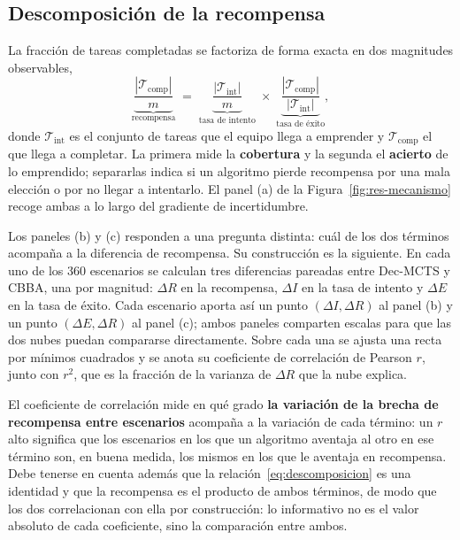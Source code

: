 \subsection{Descomposición de la recompensa} \label{subsec:exp-mecanismo}

La fracción de tareas completadas se factoriza de forma exacta en dos magnitudes observables,
\begin{equation} \label{eq:descomposicion}
    \underbrace{\frac{|\mathcal{T}_{\mathrm{comp}}|}{m}}_{\text{recompensa}}
    \;=\;
    \underbrace{\frac{|\mathcal{T}_{\mathrm{int}}|}{m}}_{\text{tasa de intento}}
    \;\times\;
    \underbrace{\frac{|\mathcal{T}_{\mathrm{comp}}|}{|\mathcal{T}_{\mathrm{int}}|}}_{\text{tasa de éxito}},
\end{equation}
donde $\mathcal{T}_{\mathrm{int}}$ es el conjunto de tareas que el equipo llega a emprender y $\mathcal{T}_{\mathrm{comp}}$ el que llega a completar. La primera mide la \textbf{cobertura} y la segunda el \textbf{acierto} de lo emprendido; separarlas indica si un algoritmo pierde recompensa por una mala elección o por no llegar a intentarlo. El panel (a) de la Figura~\ref{fig:res-mecanismo} recoge ambas a lo largo del gradiente de incertidumbre.

Los paneles (b) y (c) responden a una pregunta distinta: cuál de los dos términos acompaña a la diferencia de recompensa. Su construcción es la siguiente. En cada uno de los $360$ escenarios se calculan tres diferencias pareadas entre Dec-MCTS y CBBA, una por magnitud: $\Delta R$ en la recompensa, $\Delta I$ en la tasa de intento y $\Delta E$ en la tasa de éxito. Cada escenario aporta así un punto $(\Delta I, \Delta R)$ al panel (b) y un punto $(\Delta E, \Delta R)$ al panel (c); ambos paneles comparten escalas para que las dos nubes puedan compararse directamente. Sobre cada una se ajusta una recta por mínimos cuadrados y se anota su coeficiente de correlación de Pearson $r$, junto con $r^2$, que es la fracción de la varianza de $\Delta R$ que la nube explica.

El coeficiente de correlación mide en qué grado \textbf{la variación de la brecha de recompensa entre escenarios} acompaña a la variación de cada término: un $r$ alto significa que los escenarios en los que un algoritmo aventaja al otro en ese término son, en buena medida, los mismos en los que le aventaja en recompensa. Debe tenerse en cuenta además que la relación~\eqref{eq:descomposicion} es una identidad y que la recompensa es el producto de ambos términos, de modo que los dos correlacionan con ella por construcción: lo informativo no es el valor absoluto de cada coeficiente, sino la comparación entre ambos.

